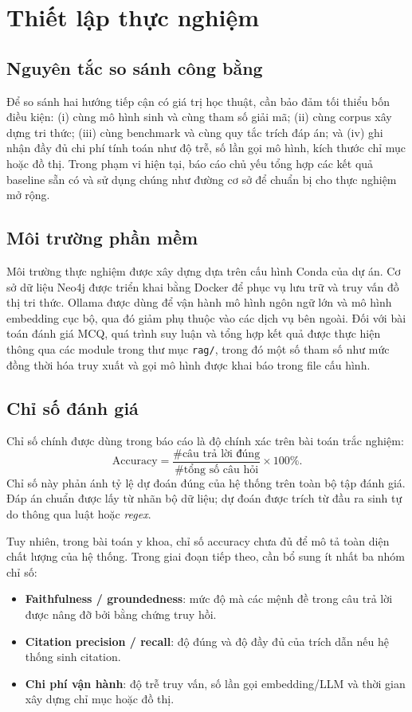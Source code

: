\documentclass[a4paper,12pt,twoside]{report}
\begin{document}
\section{Thiết lập thực nghiệm}
\subsection{Nguyên tắc so sánh công bằng}
Để so sánh hai hướng tiếp cận có giá trị học thuật, cần bảo đảm tối thiểu bốn điều kiện: (i) cùng mô hình sinh và cùng tham số giải mã; (ii) cùng corpus xây dựng tri thức; (iii) cùng benchmark và cùng quy tắc trích đáp án; và (iv) ghi nhận đầy đủ chi phí tính toán như độ trễ, số lần gọi mô hình, kích thước chỉ mục hoặc đồ thị. Trong phạm vi hiện tại, báo cáo chủ yếu tổng hợp các kết quả baseline sẵn có và sử dụng chúng như đường cơ sở để chuẩn bị cho thực nghiệm mở rộng.

\subsection{Môi trường phần mềm}
Môi trường thực nghiệm được xây dựng dựa trên cấu hình Conda của dự án. Cơ sở dữ liệu Neo4j được triển khai bằng Docker để phục vụ lưu trữ và truy vấn đồ thị tri thức. Ollama được dùng để vận hành mô hình ngôn ngữ lớn và mô hình embedding cục bộ, qua đó giảm phụ thuộc vào các dịch vụ bên ngoài. Đối với bài toán đánh giá MCQ, quá trình suy luận và tổng hợp kết quả được thực hiện thông qua các module trong thư mục \texttt{rag/}, trong đó một số tham số như mức đồng thời hóa truy xuất và gọi mô hình được khai báo trong file cấu hình.

\subsection{Chỉ số đánh giá}
Chỉ số chính được dùng trong báo cáo là độ chính xác trên bài toán trắc nghiệm:
\[
  \mathrm{Accuracy} = \frac{\#\text{câu trả lời đúng}}{\#\text{tổng số câu hỏi}} \times 100\%.
\]
Chỉ số này phản ánh tỷ lệ dự đoán đúng của hệ thống trên toàn bộ tập đánh giá. Đáp án chuẩn được lấy từ nhãn bộ dữ liệu; dự đoán được trích từ đầu ra sinh tự do thông qua luật hoặc \textit{regex}.

Tuy nhiên, trong bài toán y khoa, chỉ số accuracy chưa đủ để mô tả toàn diện chất lượng của hệ thống. Trong giai đoạn tiếp theo, cần bổ sung ít nhất ba nhóm chỉ số:
\begin{itemize}[nosep]
  \item \textbf{Faithfulness / groundedness}: mức độ mà các mệnh đề trong câu trả lời được nâng đỡ bởi bằng chứng truy hồi.
  \item \textbf{Citation precision / recall}: độ đúng và độ đầy đủ của trích dẫn nếu hệ thống sinh citation.
  \item \textbf{Chi phí vận hành}: độ trễ truy vấn, số lần gọi embedding/LLM và thời gian xây dựng chỉ mục hoặc đồ thị.
\end{itemize}
\end{document}
